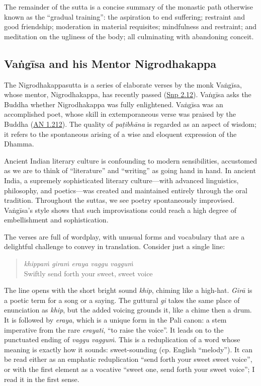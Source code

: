 \documentclass[12pt,openany]{book}%
\begin{document}
The remainder of the sutta is a concise summary of the monastic path otherwise known as the “gradual training”: the aspiration to end suffering; restraint and good friendship; moderation in material requisites; mindfulness and restraint; and meditation on the ugliness of the body; all culminating with abandoning conceit.

\subsection*{\textsanskrit{Vaṅgīsa} and his Mentor Nigrodhakappa}

The Nigrodhakappasutta is a series of elaborate verses by the monk \textsanskrit{Vaṅgīsa}, whose mentor, Nigrodhakappa, has recently passed (\href{https://suttacentral.net/snp2.12/en/sujato}{Snp 2.12}). \textsanskrit{Vaṅgīsa} asks the Buddha whether Nigrodhakappa was fully enlightened. \textsanskrit{Vaṅgīsa} was an accomplished poet, whose skill in extemporaneous verse was praised by the Buddha (\href{https://suttacentral.net/an1.212/en/sujato}{AN 1.212}). The quality of \textit{\textsanskrit{paṭibhāna}} is regarded as an aspect of wisdom; it refers to the spontaneous arising of a wise and eloquent expression of the Dhamma.

Ancient Indian literary culture is confounding to modern sensibilities, accustomed as we are to think of “literature” and “writing” as going hand in hand. In ancient India, a supremely sophisticated literary culture—with advanced linguistics, philosophy, and poetics—was created and maintained entirely through the oral tradition. Throughout the suttas, we see poetry spontaneously improvised. \textsanskrit{Vaṅgīsa}’s style shows that such improvisations could reach a high degree of embellishment and sophistication.

The verses are full of wordplay, with unusual forms and vocabulary that are a delightful challenge to convey in translation. Consider just a single line:

\begin{verse}%
\textit{\textsanskrit{khippaṁ} \textsanskrit{giraṁ} eraya vaggu \textsanskrit{vagguṁ}} \\
Swiftly send forth your sweet, sweet voice

%
\end{verse}

The line opens with the short bright sound \textit{khip}, chiming like a high-hat. \textit{\textsanskrit{Girā}} is a poetic term for a song or a saying. The guttural \textit{gi} takes the same place of enunciation as \textit{khip}, but the added voicing grounds it, like a chime then a drum. It is followed by \textit{eraya}, which is a unique form in the Pali canon: a stem imperative from the rare \textit{erayati}, “to raise the voice”. It leads on to the punctuated ending of \textit{vaggu \textsanskrit{vagguṁ}}. This is a reduplication of a word whose meaning is exactly how it sounds: sweet-sounding (cp. English “melody”). It can be read either as an emphatic reduplication “send forth your sweet sweet voice”, or with the first element as a vocative “sweet one, send forth your sweet voice”; I read it in the first sense.
\end{document}
